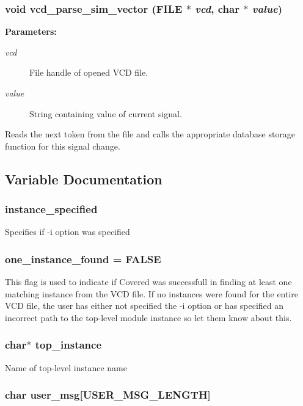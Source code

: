 \subsubsection{\setlength{\rightskip}{0pt plus 5cm}void vcd\_\-parse\_\-sim\_\-vector (FILE $\ast$ {\em vcd}, char $\ast$ {\em value})}\label{vcd_8c_a8}


\begin{Desc}
\item[{\bf Parameters: }]\par
\begin{description}
\item[
{\em vcd}]File handle of opened VCD file. \item[
{\em value}]String containing value of current signal.

\end{description}
\end{Desc}
Reads the next token from the file and calls the appropriate database storage function for this signal change. 

\subsection{Variable Documentation}
\subsubsection{ instance\_\-specified}\label{vcd_8c_a2}


Specifies if -i option was specified 
\subsubsection{ one\_\-instance\_\-found = FALSE}\label{vcd_8c_a3}


This flag is used to indicate if Covered was successfull in finding at least one matching instance from the VCD file. If no instances were found for the entire VCD file, the user has either not specified the -i option or has specified an incorrect path to the top-level module instance so let them know about this. 
\subsubsection{\setlength{\rightskip}{0pt plus 5cm}char$\ast$ top\_\-instance}\label{vcd_8c_a1}


Name of top-level instance name 
\subsubsection{\setlength{\rightskip}{0pt plus 5cm}char user\_\-msg[USER\_\-MSG\_\-LENGTH]}\label{vcd_8c_a0}


